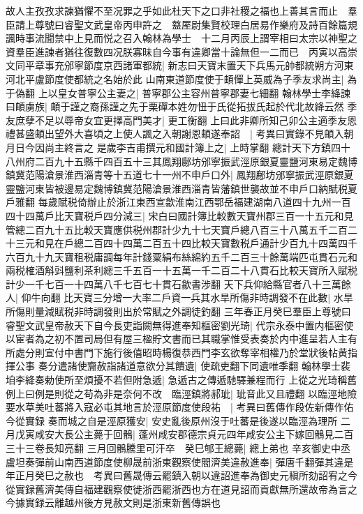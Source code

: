 故人主孜孜求諫猶懼不至况罪之乎如此杜天下之口非社稷之福也上善其言而止　羣臣請上尊號曰睿聖文武皇帝丙申許之　盩厔尉集賢校理白居易作樂府及詩百餘篇規諷時事流聞禁中上見而悦之召入翰林為學士　十二月丙辰上謂宰相曰太宗以神聖之資羣臣進諫者猶往復數四况朕寡昧自今事有違卿當十論無但一二而已　丙寅以高崇文同平章事充邠寧節度京西諸軍都統|{
	新志曰天寶末置天下兵馬元帥都統朔方河東河北平盧節度使都統之名始於此}
山南東道節度使于頔憚上英威為子季友求尚主|{
	為于偽翻}
上以皇女普寧公主妻之|{
	普寧郡公主容州普寧郡妻七細翻}
翰林學士李絳諫曰頔虜族|{
	頔于謹之裔孫謹之先于栗磾本姓勿忸于氏從拓拔氏起於代北故絳云然}
季友庶孽不足以辱帝女宜更擇高門美才|{
	更工衡翻}
上曰此非卿所知己卯公主適季友恩禮甚盛頔出望外大喜頃之上使人諷之入朝謝恩頔遂奉詔　|{
	考異曰實錄不見頔入朝月日今因尚主終言之}
是歲李吉甫撰元和國計簿上之|{
	上時掌翻}
總計天下方鎮四十八州府二百九十五縣千四百五十三其鳳翔鄜坊邠寧振武涇原銀夏靈鹽河東易定魏博鎮冀范陽滄景淮西淄青等十五道七十一州不申戶口外|{
	鳳翔鄜坊邠寧振武涇原銀夏靈鹽河東皆被邊易定魏博鎮冀范陽滄景淮西淄青皆藩鎮世襲故並不申戶口納賦税夏戶雅翻}
每歲賦税倚辦止於浙江東西宣歙淮南江西鄂岳福建湖南八道四十九州一百四十四萬戶比天寶税戶四分減三|{
	宋白曰國計簿比較數天寶州郡三百一十五元和見管總二百九十五比較天寶應供税州郡計少九十七天寶戶總八百三十八萬五千二百二十三元和見在戶總二百四十四萬二百五十四比較天寶數税戶通計少百九十四萬四千六百九十九天寶租税庸調每年計錢粟絹布絲綿約五千二百三十餘萬端匹屯貫石元和兩税榷酒斛㪷鹽利茶利總三千五百一十五萬一千二百二十八貫石比較天寶所入賦税計少一千七百一十四萬八千七百七十貫石歙書涉翻}
天下兵仰給縣官者八十三萬餘人|{
	仰牛向翻}
比天寶三分增一大率二戶資一兵其水旱所傷非時調發不在此數|{
	水旱所傷則量減賦税非時調發則出於常賦之外調徒釣翻}
三年春正月癸巳羣臣上尊號曰睿聖文武皇帝赦天下自今長吏詣闕無得進奉知樞密劉光琦|{
	代宗永泰中置内樞密使以宦者為之初不置司局但有屋三楹貯文書而已其職掌惟受表奏於内中進呈若人主有所處分則宣付中書門下施行後僖昭時楊復恭西門李玄欲奪宰相權乃於堂狀後帖黄指揮公事}
奏分遣諸使齎赦詣諸道意欲分其饋遺|{
	使疏吏翻下同遺唯季翻}
翰林學士裴垍李絳奏勅使所至煩擾不若但附急遞|{
	急遞古之傳遞馳驛兼程而行}
上從之光琦稱舊例上曰例是則從之苟為非是奈何不改　臨涇鎮將郝玼|{
	玼音此又且禮翻}
以臨涇地險要水草美吐蕃將入寇必屯其地言於涇原節度使段祐　|{
	考異曰舊傳作段佐新傳作佑今從實録}
奏而城之自是涇原獲安|{
	安史亂後原州沒于吐蕃是後遂以臨涇為理所}
二月戊寅咸安大長公主薨于回鶻|{
	蓬州咸安郡德宗貞元四年咸安公主下嫁回鶻見二百三十三卷長知亮翻}
三月回鶻騰里可汗卒　癸巳郇王總薨|{
	總上弟也}
辛亥御史中丞盧坦奏彈前山南西道節度使柳晟前浙東觀察使閻濟美違赦進奉|{
	彈唐千翻彈其違是年正月癸巳之赦也　考異曰舊晟傳云罷鎮入朝以違詔進奉為御史元稹所劾詔宥之今從實録舊濟美傳自福建觀察使徙浙西罷浙西也方在道見詔而貢獻無所還故帝為言之今據實録云離越州後方見赦文則是浙東新舊傳誤也}
